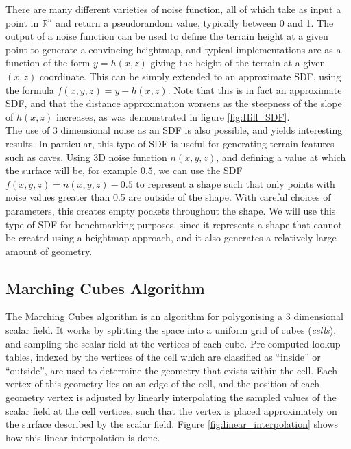 \documentclass{article}
\begin{document}
There are many different varieties of noise function, all of which take as input a point in $\mathbb{R}^n$ and return a pseudorandom value, typically between 0 and 1. The output of a noise function can be used to define the terrain height at a given point to generate a convincing heightmap, and typical implementations are as a function of the form $y = h\left(x,z\right)$ giving the height of the terrain at a given $\left(x,z\right)$ coordinate. This can be simply extended to an approximate SDF, using the formula $f\left(x,y,z\right) = y - h\left(x,z\right)$. Note that this is in fact an approximate SDF, and that the distance approximation worsens as the steepness of the slope of $h\left(x,z\right)$ increases, as was demonstrated in figure \ref{fig:Hill_SDF}.
\\
The use of 3 dimensional noise as an SDF is also possible, and yields interesting results. In particular, this type of SDF is useful for generating terrain features such as caves. Using 3D noise function $n\left(x,y,z\right)$, and defining a value at which the surface will be, for example $0.5$, we can use the SDF $f\left(x,y,z\right) = n\left(x,y,z\right) - 0.5$ to represent a shape such that only points with noise values greater than 0.5 are outside of the shape. With careful choices of parameters, this creates empty pockets throughout the shape. We will use this type of SDF for benchmarking purposes, since it represents a shape that cannot be created using a heightmap approach, and it also generates a relatively large amount of geometry. 

\subsection{Marching Cubes Algorithm}
\label{section:mc}
The Marching Cubes algorithm is an algorithm for polygonising a 3 dimensional scalar field. It works by splitting the space into a uniform grid of cubes (\textit{cells}), and sampling the scalar field at the vertices of each cube. Pre-computed lookup tables, indexed by the vertices of the cell which are classified as ``inside'' or ``outside'', are used to determine the geometry that exists within the cell. Each vertex of this geometry lies on an edge of the cell, and the position of each geometry vertex is adjusted by linearly interpolating the sampled values of the scalar field at the cell vertices, such that the vertex is placed approximately on the surface described by the scalar field. Figure \ref{fig:linear_interpolation} shows how this linear interpolation is done.
\end{document}
